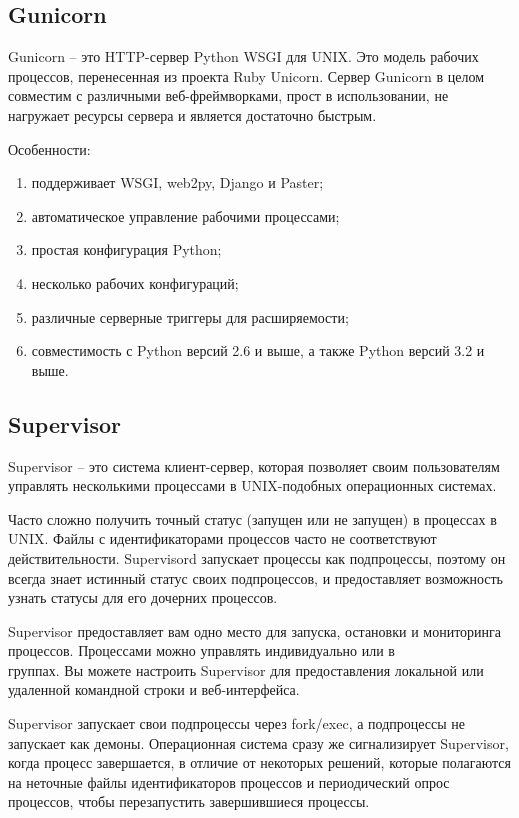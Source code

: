 \subsection{Gunicorn}
\label{sec:development:gunicorn}

Gunicorn -- это HTTP-сервер Python WSGI для UNIX. Это модель рабочих процессов, перенесенная из проекта Ruby Unicorn. Сервер Gunicorn в целом совместим с различными веб-фреймворками, прост в использовании, не нагружает ресурсы сервера и является достаточно быстрым.

Особенности:
\begin{enumerate}
  \item поддерживает WSGI, web2py, Django и Paster;
  \item автоматическое управление рабочими процессами;
  \item простая конфигурация Python;
  \item несколько рабочих конфигураций;
  \item различные серверные триггеры для расширяемости;
  \item совместимость с Python версий 2.6 и выше, а также Python версий 3.2 и выше.
\end{enumerate}

\subsection{Supervisor}
\label{sec:development:supervisor}

Supervisor -- это система клиент-сервер, которая позволяет своим пользователям управлять несколькими процессами в UNIX-подобных операционных системах.

Часто сложно получить точный статус (запущен или не запущен) в процессах в UNIX. Файлы с идентификаторами процессов часто не соответствуют действительности. Supervisord запускает процессы как подпроцессы, поэтому он всегда знает истинный статус своих подпроцессов, и предоставляет возможность узнать статусы для его дочерних процессов.

Supervisor предоставляет вам одно место для запуска, остановки и мониторинга процессов. Процессами можно управлять индивидуально или в \\группах. Вы можете настроить Supervisor для предоставления локальной или удаленной командной строки и веб-интерфейса.

Supervisor запускает свои подпроцессы через fork/exec, а подпроцессы не запускает как демоны. Операционная система сразу же сигнализирует Supervisor, когда процесс завершается, в отличие от некоторых решений, которые полагаются на неточные файлы идентификаторов процессов и периодический опрос процессов, чтобы перезапустить завершившиеся процессы.

